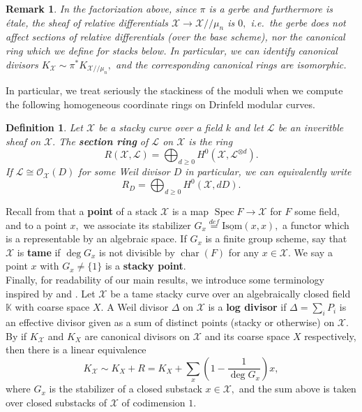\documentclass[11pt]{amsart}
\newtheorem{definition}[theorem]{Definition}
\newtheorem{remark}[theorem]{Remark}
\theoremstyle{definition}
\numberwithin{equation}{section}
\newcommand{\Isom}{\mathrm{Isom}} 	%
\newcommand{\Spec}{\operatorname{Spec}} 	%
\newcommand{\cO}{\mathcal{O}}		%
\newcommand{\sL}{\mathscr{L}}		%
\newcommand{\sX}{\mathscr{X}}		%
\newcommand{\bbK}{\mathbb{K}}		%
\begin{document}
		\begin{remark}
			In the factorization above, since $\pi$ is a gerbe and furthermore is \'etale, the sheaf of relative differentials $\sX\to \sX/\!/\mu_n$ is $0,$ i.e.\ the gerbe does not affect sections of relative differentials (over the base scheme), nor the canonical ring which we define for stacks below. In particular, we can identify canonical divisors $K_{\sX}\sim \pi^*K_{\sX/\!/\mu_n},$ and the corresponding canonical rings are isomorphic. 
		\end{remark}
		
		In particular, we treat seriously the stackiness of the moduli when we compute the following homogeneous coordinate rings on Drinfeld modular curves.  
		\begin{definition}
			Let $\sX$ be a stacky curve over a field $k$ and let $\sL$ be an inveritble sheaf on $\sX.$ The \textbf{section ring} of $\sL$ on $\sX$ is the ring 
			\[R(\sX,\sL)=\bigoplus_{d\geq 0}H^0(\sX,\sL^{\otimes d}).\]
			If $\sL\cong \cO_{\sX}(D)$ for some Weil divisor $D$ in particular, we can equivalently write 
			\[R_D=\bigoplus_{d\geq 0}H^0(\sX,dD).
			\]
		\end{definition}		
		
		Recall from \cite[Chapter $5.1$]{VZB} that a \textbf{point} of a stack $\sX$ is a map $\Spec F\to \sX$ for $F$ some field, and to a point $x,$ we associate its stabilizer $G_x\overset{def}{=}\underline{\Isom}(x,x),$ a functor which is a representable by an algebraic space. If $G_x$ is a finite group scheme, say that $\sX$ is \textbf{tame} if $\deg G_x$ is not divisible by $\operatorname{char}(F)$ for any $x\in \sX.$ We say a point $x$ with $G_x\neq \{1\}$ is a \textbf{stacky point}.\\
		
		Finally, for readability of our main results, we introduce some terminology inspired by \cite[Definition $5.6.2$]{VZB} and \cite[Proposition $5.5.6$]{VZB}. Let $\sX$ be a tame stacky curve over an algebraically closed field $\bbK$ with coarse space $X.$ A Weil divisor $\Delta$ on $\sX$ is a \textbf{log divisor} if $\Delta=\sum_i P_i$ is an effective divisor given as a sum of distinct points (stacky or otherwise) on $\sX.$ By \cite[Proposition $5.5.6$]{VZB} if $K_{\sX}$ and $K_X$ are canonical divisors on $\sX$ and its coarse space $X$ respectively, then there is a linear equivalence
		\[K_{\sX}\sim K_X+R=K_X+\sum_x \left(1-\frac{1}{\deg G_x}\right)x,\]
		where $G_x$ is the stabilizer of a closed substack $x\in \sX,$ and the sum above is taken over closed substacks of $\sX$ of codimension $1.$
\end{document}
